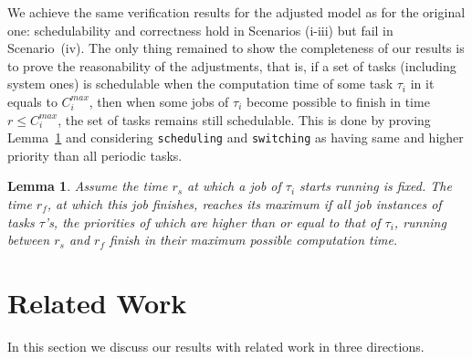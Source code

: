 \documentclass[10pt,journal]{IEEEtran}
\newtheorem{lemma}[theorem]{Lemma}
\begin{document}
{{We achieve the same verification results for the adjusted model as for
the original one: schedulability and correctness hold in Scenarios
(i-iii) but fail in Scenario~(iv). The only thing remained to show the
completeness of our results is to prove the reasonability of the
adjustments, that is, if a set of tasks (including system ones) is
schedulable when the computation time of some task $\tau_i$ in it
equals to $C_i^{max}$, then when some jobs of $\tau_i$ become possible
to finish in time $r\le C_i^{max}$, the set of tasks remains still
schedulable. This is done by proving Lemma~\ref{l:max} and considering
\verb|scheduling| and \verb|switching| as having same and higher
priority than all periodic tasks.
\begin{lemma}
\label{l:max}
Assume the time $r_s$ at which a job of $\tau_i$ starts running is
fixed. The time $r_f$, at which this job finishes, reaches its maximum
if all job instances of tasks $\tau$'s, the priorities of which are
higher than or equal to that of $\tau_i$, running between $r_s$ and
$r_f$ finish in their maximum possible computation time.
\end{lemma}
}

\section{Related Work}
\label{s:relate}
In this section we discuss our results with related
work in three directions.

}
\end{document}
